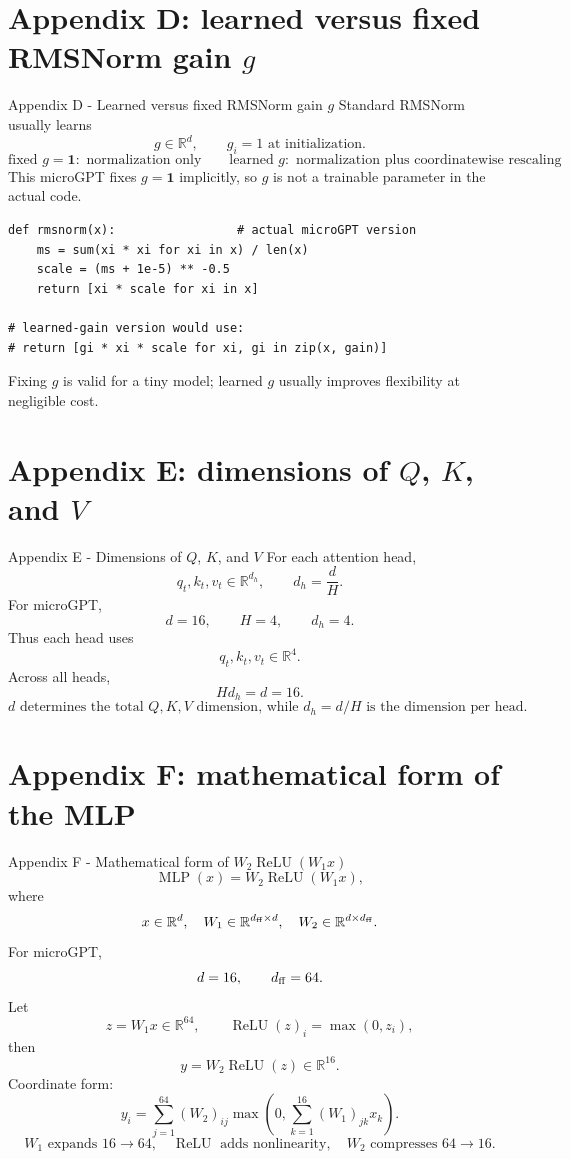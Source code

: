 \documentclass[
  xcolor={svgnames,dvipsnames},
  hyperref={pagebackref,bookmarks},
  aspectratio=169,
  11pt
]{beamer}
\begin{document}
\section[Appendix D: RMSNorm gain]{Appendix D: learned versus fixed RMSNorm gain $g$}
\begin{frame}[fragile]{Appendix D - Learned versus fixed RMSNorm gain $g$}
\small
Standard RMSNorm usually learns
\[
g\in\mathbb R^d,
\qquad g_i=1\text{ at initialization.}
\]
\[
\boxed{\text{fixed }g=\mathbf1:\text{ normalization only}}
\qquad
\boxed{\text{learned }g:\text{ normalization plus coordinatewise rescaling}}
\]
This microGPT fixes $g=\mathbf1$ implicitly, so $g$ is not a trainable parameter in the actual code.
\begin{lstlisting}
def rmsnorm(x):                 # actual microGPT version
    ms = sum(xi * xi for xi in x) / len(x)
    scale = (ms + 1e-5) ** -0.5
    return [xi * scale for xi in x]

# learned-gain version would use:
# return [gi * xi * scale for xi, gi in zip(x, gain)]
\end{lstlisting}
Fixing $g$ is valid for a tiny model; learned $g$ usually improves flexibility at negligible cost.
\end{frame}

\section[Appendix E: Q/K/V dimensions]{Appendix E: dimensions of $Q$, $K$, and $V$}
\begin{frame}{Appendix E - Dimensions of $Q$, $K$, and $V$}
\small
For each attention head,
\[
q_t,k_t,v_t\in\mathbb R^{d_h},\qquad d_h=\frac dH.
\]
For microGPT,
\[
d=16,\qquad H=4,\qquad d_h=4.
\]
Thus each head uses
\[
q_t,k_t,v_t\in\mathbb R^4.
\]
Across all heads,
\[
Hd_h=d=16.
\]
\[
\boxed{d\text{ determines the total }Q,K,V\text{ dimension, while }d_h=d/H\text{ is the dimension per head.}}
\]
\end{frame}

\section[Appendix F: MLP formula]{Appendix F: mathematical form of the MLP}
\begin{frame}{Appendix F - Mathematical form of $W_2\operatorname{ReLU}(W_1x)$}
\small
\[
\operatorname{MLP}(x)=W_2\operatorname{ReLU}(W_1x),
\]
where
\[
x\in\mathbb R^d,
\quad W_1\in\mathbb R^{d_{\rm ff}\times d},
\quad W_2\in\mathbb R^{d\times d_{\rm ff}}.
\]
For microGPT,
\[
d=16,
\qquad d_{\rm ff}=64.
\]
Let
\[
z=W_1x\in\mathbb R^{64},\qquad \operatorname{ReLU}(z)_i=\max(0,z_i),
\]
then
\[
y=W_2\operatorname{ReLU}(z)\in\mathbb R^{16}.
\]
Coordinate form:
\[
y_i=\sum_{j=1}^{64}(W_2)_{ij}\max\left(0,\sum_{k=1}^{16}(W_1)_{jk}x_k\right).
\]
\[
\boxed{W_1\text{ expands }16\to64,\quad \operatorname{ReLU}\text{ adds nonlinearity},\quad W_2\text{ compresses }64\to16.}
\]
\end{frame}
\end{document}
